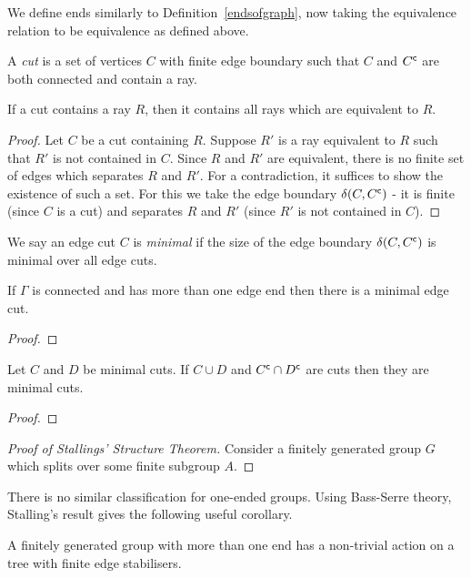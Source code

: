 We define ends similarly to Definition~\ref{endsofgraph}, now taking the equivalence relation to be equivalence as defined above. %

\begin{definition}[Cut]
 A \emph{cut} is a set of vertices \(C\) with finite edge boundary such that \(C\) and \({C}^{\mathsf{c}}\) are both connected and contain a ray.
\end{definition}

\begin{proposition}
     If a cut contains a ray \(R\), then it contains all rays which are equivalent to \(R\).
\end{proposition}

\begin{proof}
    Let \(C\) be a cut containing \(R\). Suppose \(R'\) is a ray equivalent to \(R\) such that \(R'\) is not contained in \(C\).
    Since \(R\) and \(R'\) are equivalent, there is no finite set of edges which separates \(R\) and \(R'\). For a contradiction, it suffices to show the existence of such a set. For this we take the edge boundary \(\delta(C,{C}^{\mathsf{c}})\) - it is finite (since \(C\) is a cut) and separates \(R\) and \(R'\) (since \(R'\) is not contained in \(C\)). 
\end{proof}

We say an edge cut \(C\) is \emph{minimal} if the size of the edge boundary \(\delta(C, {C}^{\mathsf{c}})\) is minimal over all edge cuts.
\begin{lemma}
     If \(\Gamma\) is connected and has more than one edge end then there is a minimal edge cut.
\end{lemma}

\begin{proof}
    
\end{proof}

\begin{lemma}
    Let \(C\) and \(D\) be minimal cuts. If \(C \cup D\) and \({C}^{\mathsf{c}} \cap {D}^{\mathsf{c}}\) are cuts then
they are minimal cuts.
\end{lemma}

\begin{proof}
    
\end{proof}

\begin{proof}[Proof of Stallings' Structure Theorem]
    Consider a finitely generated group \(G\) which splits over some finite subgroup \(A\).
\end{proof}

There is no similar classification for one-ended groups. Using Bass-Serre theory, Stalling's result gives the following useful corollary. %
\begin{corollary}
    A finitely generated group with more than one end has a non-trivial action on a tree with finite edge stabilisers.
\end{corollary}
\newpage %